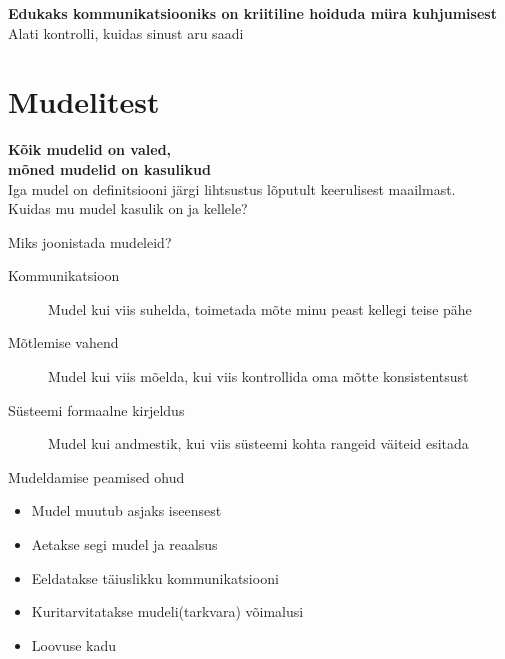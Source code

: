 \documentclass{beamer}
\begin{document}
\begin{frame}[fragile]
	\begin{center}
		\LARGE{\textbf{Edukaks kommunikatsiooniks on kriitiline hoiduda müra kuhjumisest}}
		\\[4cm]
		\small{Alati kontrolli, kuidas sinust aru saadi}
	\end{center}
\end{frame}


\section{Mudelitest}
\begin{frame}[fragile]
	\begin{center}
		\LARGE{\textbf{Kõik mudelid on valed, \\mõned mudelid on kasulikud}}
		\\[4cm]
		\small{Iga mudel on definitsiooni järgi lihtsustus lõputult keerulisest maailmast.\\Kuidas mu mudel kasulik on ja kellele?}
	\end{center}
\end{frame}

\begin{frame}{Miks joonistada mudeleid?}
\begin{description}
	\item[Kommunikatsioon] Mudel kui viis suhelda, toimetada mõte minu peast kellegi teise pähe
	\item[Mõtlemise vahend] Mudel kui viis mõelda, kui viis kontrollida oma mõtte konsistentsust
	\item[Süsteemi formaalne kirjeldus] Mudel kui andmestik, kui viis süsteemi kohta rangeid väiteid esitada
\end{description}
	
\end{frame}

\begin{frame}{Mudeldamise peamised ohud}
	\begin{itemize}
		\item Mudel muutub asjaks iseensest
		\item Aetakse segi mudel ja reaalsus
		\item Eeldatakse täiuslikku kommunikatsiooni
		\item Kuritarvitatakse mudeli(tarkvara) võimalusi
		\item Loovuse kadu
	\end{itemize}
\end{frame}
\end{document}
